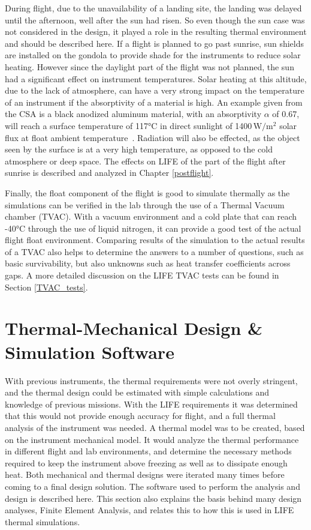 During flight, due to the unavailability of a landing site, the landing was delayed until the afternoon, well after the sun had risen. So even though the sun case was not considered in the design, it played a role in the resulting thermal environment and should be described here. If a flight is planned to go past sunrise, sun shields are installed on the gondola to provide shade for the instruments to reduce solar heating. However since the daylight part of the flight was not planned, the sun had a significant effect on instrument temperatures. Solar heating at this altitude, due to the lack of atmosphere, can have a very strong impact on the temperature of an instrument if the absorptivity of a material is high. An example given from the CSA is a black anodized aluminum material, with an absorptivity $\alpha$ of 0.67, will reach a surface temperature of 117°C in direct sunlight of 1400\,$\mathrm{W/m^2}$ solar flux at float ambient temperature~\citep{STRATOS_CARMENCITA_doc}. Radiation will also be effected, as the object seen by the surface is at a very high temperature, as opposed to the cold atmosphere or deep space. The effects on LIFE of the part of the flight after sunrise is described and analyzed in Chapter \ref{postflight}.

Finally, the float component of the flight is good to simulate thermally as the simulations can be verified in the lab through the use of a Thermal Vacuum chamber (TVAC). With a vacuum environment and a cold plate that can reach -40°C through the use of liquid nitrogen, it can provide a good test of the actual flight float environment. Comparing results of the simulation to the actual results of a TVAC also helps to determine the answers to a number of questions, such as basic survivability, but also unknowns such as heat transfer coefficients across gaps. A more detailed discussion on the LIFE TVAC tests can be found in Section \ref{TVAC_tests}.

\section{Thermal-Mechanical Design \& Simulation Software}\label{thermal_sim_sw_sec}
With previous instruments, the thermal requirements were not overly stringent, and the thermal design could be estimated with simple calculations and knowledge of previous missions. With the LIFE requirements it was determined that this would not provide enough accuracy for flight, and a full thermal analysis of the instrument was needed. A thermal model was to be created, based on the instrument mechanical model. It would analyze the thermal performance in different flight and lab environments, and determine the necessary methods required to keep the instrument above freezing as well as to dissipate enough heat. Both mechanical and thermal designs were iterated many times before coming to a final design solution. The software used to perform the analysis and design is described here. This section also explains the basis behind many design analyses, Finite Element Analysis, and relates this to how this is used in LIFE thermal simulations.

